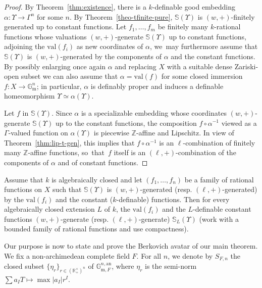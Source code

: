 \documentclass[JEP,XML,SOM,Unicode,ThmDefs,NoEqCountersInSection,published]{cedram}
\newcommand{\abs}[1]{\mathopen|#1\mathclose|}
\newcommand{\val}{\mathrm{val}}
\newcommand{\gm}{\bG_{\mathrm m}}
\newcommand{\bG}{\mathbb G}
\newcommand{\R}{\mathbb R}
\newcommand{\Z}{\mathbb Z}
\renewcommand{\SS}{\mathbb S}
\theoremstyle{plain}
\theoremstyle{definition}
\begin{document}
\begin{proof}
By Theorem~\ref{thm:existence}, there is a $k$-definable
good embedding $\alpha: \Upsilon\to \Gamma^n$ for some $n$.
By Theorem~\ref{theo-tfinite-pure}, $\SS(\Upsilon)$ is
$(w,+)$-finitely generated up to constant functions.
Let $f_1,\ldots,f_m$ be finitely
many $k$-rational functions whose valuations $(w,+)$-generate $\SS(\Upsilon)$ up to
constant functions, adjoining the $\val (f_i)$ as new coordinates of
$\alpha$, we~may furthermore assume
that $\SS(\Upsilon)$
is $(w,+)$-generated by the components of $\alpha$
and the constant functions.
By possibly enlarging once again $\alpha$ and replacing
$X$ with a suitable dense Zariski-open subset we can also assume that
$\alpha=\val (f)$ for some closed immersion
$f\colon X\to \gm^n$;
in particular, $\alpha$ is definably proper
and induces a definable
homeomorphism $\Upsilon\simeq \alpha(\Upsilon)$.

Let $f$ in $\SS(\Upsilon)$. Since $\alpha$ is a specializable embedding whose coordinates $(w,+)$-generate
$\SS(\Upsilon)$ up to the constant functions, the composition
$f\circ \alpha^{-1}$ viewed
as a $\Gamma$\nobreakdash-valued function on
$\alpha(\Upsilon)$ is piecewise $\Z$-affine and Lipschitz. In view of
Theorem~\ref{thm:lip-t-gen}, this implies that
$f\circ \alpha^{-1}$ is an $\ell$-combination of finitely
many $\Z$-affine functions,
so~that~$f$ itself
is an $(\ell,+)$-combination of the
components of $\alpha$ and of
constant functions.
\end{proof}

\begin{rema}\label{wgeneration-scalarextension}
Assume that $k$ is algebraically closed and let
$(f_1,\ldots,f_n)$ be a family of rational functions on $X$ such that
$\SS(\Upsilon)$ is $(w,+)$-generated
(resp. $(\ell,+)$-generated)
by the $\val (f_i)$ and the constant
($k$-definable) functions.
Then for every algebraically closed
extension $L$ of $k$,
the $\val (f_i)$ and the $L$-definable
constant functions $(w,+)$-generate (resp.
$(\ell,+)$-generate) $\SS_L(\Upsilon)$
(work with a bounded family of
rational functions and use compactness).
\end{rema}

Our purpose is now
to state and prove the Berkovich avatar of our main theorem. We fix a non-archimedean complete field $F$. For all $n$, we denote by $S_{F,n}$ the closed subset $\{\eta_r\}_{r\in (\R^\times_+)^n}$
of $\bG_{\mathrm m,F}^{n,\mathrm{an}}$, where $\eta_r$ is the semi-norm
$\sum a_I T \mapsto \max \abs{a_I}r^I$.
\end{document}
